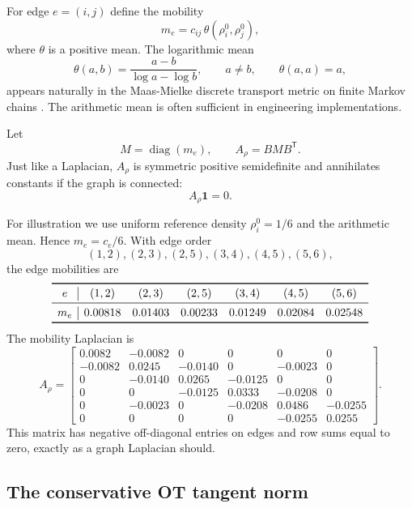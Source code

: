 \documentclass[11pt]{article}
\numberwithin{equation}{section}
\newcommand{\diag}{\operatorname{diag}}
\newcommand{\ones}{\mathbf{1}}
\newcommand{\transpose}{^{\mathsf T}}
\begin{document}
For edge $e=(i,j)$ define the mobility
\begin{equation}
  m_e=c_{ij}\,\theta(\rho_i^0,\rho_j^0),
  \label{eq:edge-mobility}
\end{equation}
where $\theta$ is a positive mean.  The logarithmic mean
\begin{equation}
  \theta(a,b)=\frac{a-b}{\log a-\log b},
  \qquad a\ne b,
  \qquad
  \theta(a,a)=a,
  \label{eq:log-mean}
\end{equation}
appears naturally in the Maas-Mielke discrete transport metric on finite Markov chains \cite{Maas2011,Mielke2013}.  The arithmetic mean is often sufficient in engineering implementations.

Let
\begin{equation}
  M=\diag(m_e),
  \qquad
  A_\rho=BMB\transpose.
  \label{eq:Arho}
\end{equation}
Just like a Laplacian, $A_\rho$ is symmetric positive semidefinite and annihilates constants if the graph is connected:
\[
  A_\rho\ones=0.
\]

\begin{runningexample}
For illustration we use uniform reference density $\rho_i^0=1/6$ and the arithmetic mean.  Hence $m_e=c_e/6$.  With edge order
\[
  (1,2),(2,3),(2,5),(3,4),(4,5),(5,6),
\]
the edge mobilities are
\[
\begin{array}{c|cccccc}
\toprule
 e&(1,2)&(2,3)&(2,5)&(3,4)&(4,5)&(5,6)\\
\midrule
 m_e&0.00818&0.01403&0.00233&0.01249&0.02084&0.02548\\
\bottomrule
\end{array}
\]
The mobility Laplacian is
\[
A_\rho=\begin{bmatrix}
 0.0082&-0.0082&0&0&0&0\\
-0.0082&0.0245&-0.0140&0&-0.0023&0\\
0&-0.0140&0.0265&-0.0125&0&0\\
0&0&-0.0125&0.0333&-0.0208&0\\
0&-0.0023&0&-0.0208&0.0486&-0.0255\\
0&0&0&0&-0.0255&0.0255
\end{bmatrix}.
\]
This matrix has negative off-diagonal entries on edges and row sums equal to zero, exactly as a graph Laplacian should.
\end{runningexample}

\subsection{The conservative OT tangent norm}
\label{subsec:conservative-ot}
\end{document}
